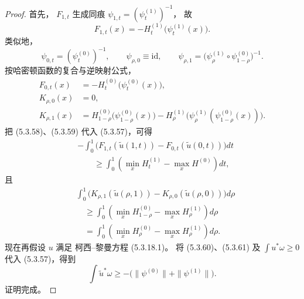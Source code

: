 \begin{proof}
首先，
$F_{1,t}$ 生成同痕
$\psi_{1,t}
=(\psi_t^{(1)})^{-1}$，
故
\begin{equation}
F_{1,t}(x)
=-H_t^{(1)}
\bigl(\psi_t^{(1)}(x)\bigr).
\tag{5.3.58}\label{eq:5-3-58}
\end{equation}
类似地，
\[
\psi_{0,t}
=(\psi_t^{(0)})^{-1},
\qquad
\psi_{\rho,0}\equiv\mathrm{id},
\qquad
\psi_{\rho,1}
=\bigl(
\psi_\rho^{(1)}
\circ\psi_{1-\rho}^{(0)}
\bigr)^{-1}.
\]
按哈密顿函数的复合与逆映射公式，
\begin{equation}
\begin{aligned}
F_{0,t}(x)
&=-H_t^{(0)}
\bigl(\psi_t^{(0)}(x)\bigr),\\
K_{\rho,0}(x)&=0,\\
K_{\rho,1}(x)
&=
H_{1-\rho}^{(0)}
\bigl(\psi_{1-\rho}^{(0)}(x)\bigr)
-H_\rho^{(1)}
\bigl(
\psi_\rho^{(1)}
(\psi_{1-\rho}^{(0)}(x))
\bigr).
\end{aligned}
\tag{5.3.59}\label{eq:5-3-59}
\end{equation}
把 (5.3.58)、(5.3.59)
代入 (5.3.57)，可得
\begin{equation}
\begin{aligned}
&-\int_0^1
\bigl(
F_{1,t}(\widetilde u(1,t))
-F_{0,t}(\widetilde u(0,t))
\bigr)dt
\\
&\qquad\ge
\int_0^1
\left(
\min_x H_t^{(1)}
-\max_x H^{(0)}
\right)dt,
\end{aligned}
\tag{5.3.60}\label{eq:5-3-60}
\end{equation}
且
\begin{equation}
\begin{aligned}
&\int_0^1
\bigl(
K_{\rho,1}(\widetilde u(\rho,1))
-K_{\rho,0}(\widetilde u(\rho,0))
\bigr)d\rho
\\
&\quad\ge
\int_0^1
\left(
\min_x H_{1-\rho}^{(0)}
-\max_x H_\rho^{(1)}
\right)d\rho
\\
&\quad=
\int_0^1
\left(
\min_x H_\rho^{(0)}
-\max_x H_\rho^{(1)}
\right)d\rho.
\end{aligned}
\tag{5.3.61}\label{eq:5-3-61}
\end{equation}
现在再假设 $u$ 满足
柯西--黎曼方程 (5.3.18.1)。
将 (5.3.60)、(5.3.61)
及 $\int u^*\omega\ge0$
代入 (5.3.57)，得到
\begin{equation}
\int\widetilde u^*\omega
\ge-
\bigl(
\|\psi^{(0)}\|
+\|\psi^{(1)}\|
\bigr).
\tag{5.3.62}\label{eq:5-3-62}
\end{equation}
证明完成。
\end{proof}


